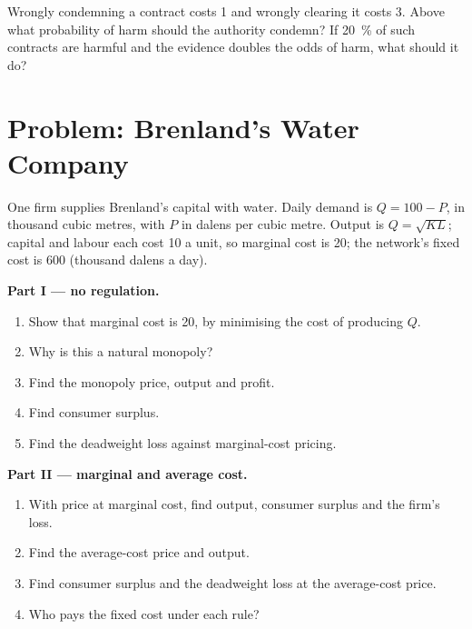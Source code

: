 \begin{exercise}[$\star\star\star$]\label{exo:b3:competition-policy:12}
Wrongly condemning a contract costs 1 and wrongly clearing it costs 3. Above what
probability of harm should the authority condemn? If 20~\% of such contracts are
harmful and the evidence doubles the odds of harm, what should it do?
\end{exercise}

\section{Problem: Brenland's Water Company}\label{sec:b3:competition-policy:problem}

\begin{problem}\label{pb:b3:competition-policy:water}
One firm supplies Brenland's capital with water. Daily demand is $Q = 100 - P$, in thousand
cubic metres, with $P$ in dalens per cubic metre. Output is $Q = \sqrt{KL}$; capital and labour each cost 10
a unit, so marginal cost is 20; the network's fixed cost is 600 (thousand dalens a day). %

\medskip\noindent\textbf{Part I --- no regulation.}
\begin{enumerate}
\item Show that marginal cost is 20, by minimising the cost of producing $Q$.
\item Why is this a natural monopoly?
\item Find the monopoly price, output and profit.
\item Find consumer surplus.
\item Find the deadweight loss against marginal-cost pricing.
\end{enumerate}

\medskip\noindent\textbf{Part II --- marginal and average cost.}
\begin{enumerate}[resume]
\item With price at marginal cost, find output, consumer surplus and the firm's loss.
\item Find the average-cost price and output.
\item Find consumer surplus and the deadweight loss at the average-cost price.
\item Who pays the fixed cost under each rule?
\end{enumerate}


\end{problem}
